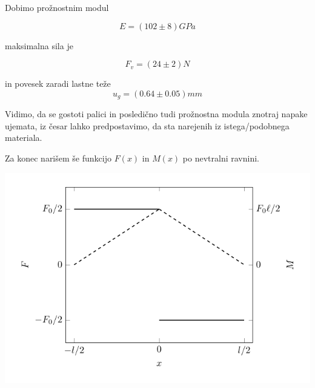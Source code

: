 \documentclass[12pt]{report}
\begin{document}
Dobimo prožnostnim modul 

\[
E = (102 \pm 8)GPa
\]

maksimalna sila je

\[
F_v = (24 \pm 2)N  
\]

in povesek zaradi lastne teže
\[
u_g = (0.64 \pm  0.05)mm
\]

Vidimo, da se gostoti palici in posledično tudi prožnostna modula znotraj napake ujemata, iz česar lahko predpostavimo, da sta narejenih iz istega/podobnega materiala. 

Za konec narišem še funkcijo $F(x)$ in $M(x)$ po nevtralni ravnini. 

\begin{slika}[H]
  \centering
  \includegraphics{F-and-M}
\end{slika}
\end{document}
